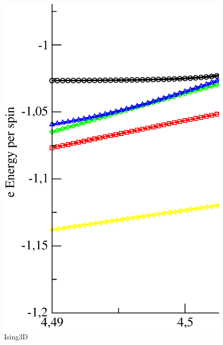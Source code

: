 \begin{figure}[!htpb]
  \centering
  \includegraphics[width=15cm]{./plots/Ising3D/Ising3D_Energy_vs_Temperature.eps}
  \caption{Ising3D}
\end{figure}


